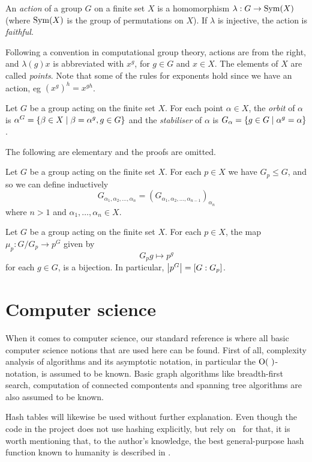 \begin{deff}
An \emph{action} of a group $G$ on a finite set $X$ is a homomorphism
$\lambda : G \to \operatorname{Sym}( X )$ (where $\operatorname{Sym}( X )$ is the group of
permutations on $X$). If $\lambda$ is injective, the action is
\emph{faithful}. 
\end{deff}
\begin{remark}
Following a convention in computational group theory, actions are from the right, and $\lambda(g)x$ is abbreviated with $x^g$, for $g \in G$ and $x \in X$. The elements of $X$ are called \emph{points}. Note that some of the rules for exponents hold since we have an action, eg $(x^g)^h = x^{gh}$.
\end{remark}

\begin{deff}
Let $G$ be a group acting on the finite set $X$. For each point
$\alpha \in X$, the \emph{orbit} of $\alpha$ is $\alpha^G = \left\lbrace \beta
\in X \mid \beta = \alpha^g, g \in G \right\rbrace$ and the \emph{stabiliser} of
$\alpha$ is $G_{\alpha} = \left\lbrace g \in G \mid \alpha^g = \alpha \right\rbrace$.
\end{deff}

The following are elementary and the proofs are omitted.
\begin{pr}
Let $G$ be a group acting on the finite set $X$. For each $p \in X$ we have $G_p \leq G$, and so we can define inductively 
\begin{equation}
G_{\alpha_1, \alpha_2, \dotsc, \alpha_n} = (G_{\alpha_1, \alpha_2, \dotsc, \alpha_{n - 1}})_{\alpha_n}
\end{equation}
where $n > 1$ and $\alpha_1, \dotsc, \alpha_n \in X$.
\end{pr}

\begin{pr} \label{thm_orbit_stab}
Let $G$ be a group acting on the finite set $X$. For each $p \in X$, the map $\mu_p : G / G_p \to p^G$ given by
\begin{equation}
G_p g \mapsto p^g
\end{equation}
for each $g \in G$, is a bijection. In particular, $\left\lvert p^G \right\rvert = [G : G_p]$.
\end{pr}

\section{Computer science}
When it comes to computer science, our standard reference is
\cite{clr90} where all basic computer science notions that are used here can be
found. First of all, complexity analysis of algorithms and its
asymptotic notation, in particular the $\OR$-notation, is assumed to be
known. Basic graph algorithms like breadth-first search, computation
of connected compontents and spanning tree algorithms are also assumed to be known.

Hash tables will likewise be used without further explanation. Even
though the code in the project does not use hashing explicitly, but
rely on \GAP~for that, it is worth mentioning that, to the author's
knowledge, the best general-purpose hash function known to humanity is
described in \cite{jenkins97}.
